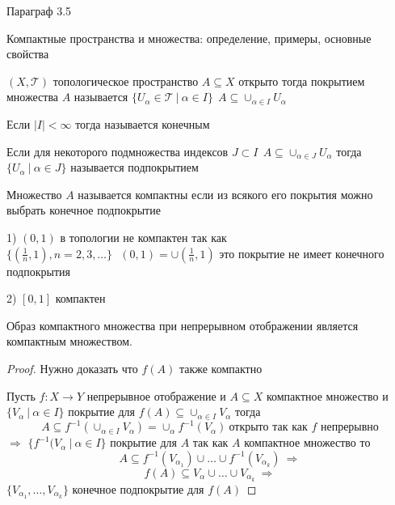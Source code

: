 \begin{title}[\Large]
  Параграф 3.5
\end{title}

\begin{title}[\Large]
  Компактные пространства и множества: определение, примеры, основные свойства
\end{title}

\begin{define}
  $(X, \mathcal{T})$ топологическое пространство $A \subseteq X$ открыто тогда
  покрытием множества $A$ называется $\{ U_{\alpha} \in \mathcal{T} ~ | ~
  \alpha \in I \} ~~ A \subseteq \cup_{\alpha \in I} U_{\alpha}$

  Если $|I| < \infty$ тогда называется конечным

  Если для некоторого подмножества индексов $J \subset I ~~
  A \subseteq \cup_{\alpha \in J} U_{\alpha}$ тогда $\{U_{\alpha} ~ | ~
  \alpha \in J \}$ называется подпокрытием
\end{define}

\begin{define}
  Множество $A$ называется компактны если из всякого его покрытия можно выбрать
  конечное подпокрытие
\end{define}

\begin{block}[Примеры]
  1)  $(0,1)$ в топологии не компактен так как $\{(\frac{1}{n}, 1),
  n = 2,3, \ldots\} ~~~ (0,1) = \cup (\frac{1}{n}, 1)$ это покрытие не имеет
  конечного подпокрытия

  2) $[0,1]$ компактен
\end{block}

\begin{theorem}
  Образ компактного множества при непрерывном отображении является компактным
  множеством.
\end{theorem}

\begin{proof}
  Нужно доказать что $f(A)$ также компактно

  Пусть $f: X \to Y$ непрерывное отображение и $A \subseteq X$ компактное
  множество и $\{ V_{\alpha} ~ | ~ \alpha \in I \}$ покрытие для $f(A) \subseteq
  \cup_{\alpha \in I} V_{\alpha}$ тогда
  $$
  A \subseteq f^{-1} (\cup_{\alpha \in I} V_{\alpha}) =
  \cup_{\alpha} f^{-1}(V_{\alpha}) ~ \text{открыто так как $f$ непрерывно}
  $$
  $\Rightarrow$ $\{f^{-1}(V_{\alpha} ~ | ~ \alpha \in I\}$ покрытие для $A$
  так как $A$ компактное множество то
  $$
  A \subseteq f^{-1} (V_{\alpha_1}) \cup \ldots \cup f^{-1} (V_{\alpha_k})
  ~ \Rightarrow
  $$
  $$
  f(A) \subseteq V_{\alpha} \cup \ldots \cup V_{\alpha_k} ~ \Rightarrow
  $$
  $\{V_{\alpha_1}, \ldots, V_{\alpha_k}\}$ конечное подпокрытие для $f(A)$
\end{proof}

